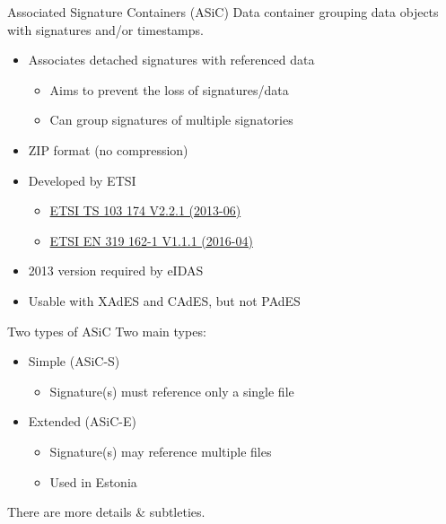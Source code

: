 \begin{frame}{Associated Signature Containers (ASiC)}
  Data container grouping data objects with signatures and/or timestamps.
  \begin{itemize}[<+(1)->]
    \item Associates detached signatures with referenced data
    \begin{itemize}
      \item Aims to prevent the loss of signatures/data
      \item Can group signatures of multiple signatories
    \end{itemize}
    \item ZIP format (no compression)
    \item Developed by ETSI
    \begin{itemize}
      \item \href{http://www.etsi.org/deliver/etsi_ts/103100_103199/103174/02.02.01_60/ts_103174v020201p.pdf}{ETSI TS 103 174 V2.2.1 (2013-06)}
      \item \href{http://www.etsi.org/deliver/etsi_en/319100_319199/31916202/01.01.01_60/en_31916202v010101p.pdf}{ETSI EN 319 162-1 V1.1.1 (2016-04)}
    \end{itemize}
    \item 2013 version required by eIDAS
    \item Usable with XAdES and CAdES, but not PAdES
  \end{itemize}
\end{frame}

\begin{frame}{Two types of ASiC}
  Two main types:
  \begin{itemize}[<+(1)->]
    \item Simple (ASiC-S)
    \begin{itemize}
      \item Signature(s) must reference only a single file
    \end{itemize}
    \item Extended (ASiC-E)
    \begin{itemize}
      \item Signature(s) may reference multiple files
      \item Used in Estonia
    \end{itemize}
  \end{itemize}

  \vspace*{1em}

  \pause
  There are more details \& subtleties.
\end{frame}

